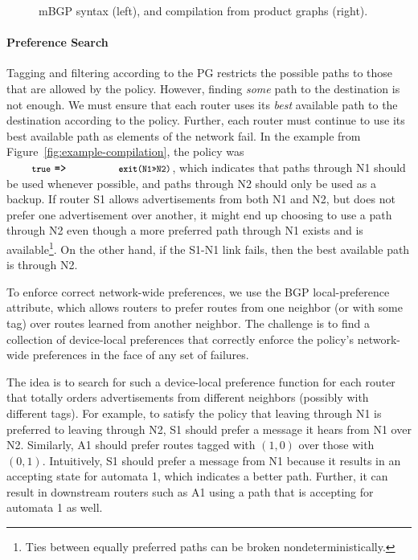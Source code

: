 \documentclass[numbers, 10pt, preprint]{sigplanconf}
\newcommand{\para}[1]{\paragraph*{\textbf{#1}}}
\newcommand{\CD}[1]{\texttt{\small #1}}
\newcommand{\KW}[1]{\texttt{\small\bfseries{#1}}}
\newcommand{\True}{\CD{true}}
\newcommand{\Prefer}{\texttt{>>}}
\newcommand{\Path}{\texttt{=>}}
\newcommand{\Exit}{\KW{exit}}
\begin{document}
\begin{figure}[t!]
  \vspace{1em}
  \hrulefill%
  \vspace{-.8em}
  \caption{mBGP syntax (left), and compilation from product graphs (right).}
  \label{fig:concretization}
  \vspace{-.4em}
\end{figure}%


\para{Preference Search}

Tagging and filtering according to the PG restricts the possible paths to those that are allowed by the policy. However, finding \emph{some} path to the destination is not enough. We must ensure that each router uses its \emph{best} available path to the destination according to the policy. Further, each router must continue to use its best available path as elements of the network fail. In the example from Figure~\ref{fig:example-compilation}, the policy was $\True ~\Path~ \CD{\Exit(N1\Prefer N2)}$, which indicates that paths through N1 should be used whenever possible, and paths through N2 should only be used as a backup. If router S1 allows advertisements from both N1 and N2, but does not prefer one advertisement over another, it might end up choosing to use a path through N2 even though a more preferred path through N1 exists and is available\footnote{Ties between equally preferred paths can be broken nondeterministically.}. On the other hand, if the S1-N1 link fails, then the best available path is through N2.

To enforce correct network-wide preferences, we use the BGP local-preference attribute, which allows routers to prefer routes from one neighbor (or with some tag) over routes learned from another neighbor. The challenge is to find a collection of device-local preferences that correctly enforce the policy's network-wide preferences in the face of any set of failures.

The idea is to search for such a device-local preference function for each router that totally orders advertisements from different neighbors (possibly with different tags). For example, to satisfy the policy that leaving through N1 is preferred to leaving through N2, S1 should prefer a message it hears from N1 over N2. Similarly, A1 should prefer routes tagged with $(1,0)$ over those with $(0,1)$. Intuitively, S1 should prefer a message from N1 because it results in an accepting state for automata 1, which indicates a better path. Further, it can result in downstream routers such as A1 using a path that is accepting for automata 1 as well.
\end{document}
